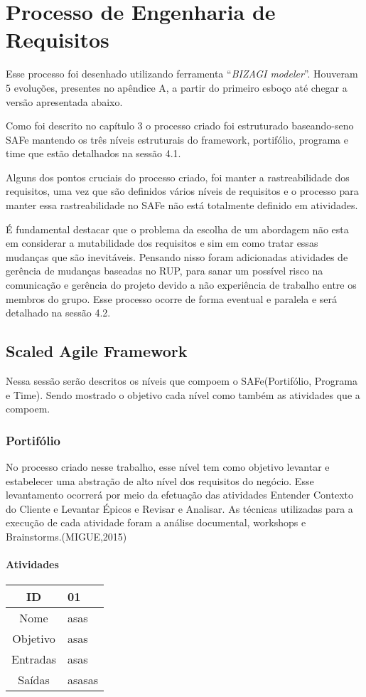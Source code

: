 \chapter[Processo de Engenharia de Requisitos]{Processo de Engenharia de Requisitos}\label{cap4}

Esse processo foi desenhado utilizando ferramenta ``\textit{BIZAGI modeler}''. Houveram 5 evoluções,
presentes no apêndice A, a partir do primeiro esboço até chegar a versão apresentada abaixo.


Como foi descrito no capítulo 3 o processo criado foi estruturado baseando-seno
SAFe mantendo os três níveis estruturais do framework, portifólio, programa e time
que estão detalhados na sessão 4.1.

Alguns dos pontos cruciais do processo criado, foi manter a rastreabilidade dos requisitos,
uma vez que são definidos vários níveis de requisitos e o processo para manter essa
rastreabilidade  no SAFe não está totalmente definido em atividades.

É fundamental destacar que o problema da escolha de um abordagem não esta em considerar
a mutabilidade dos requisitos e sim em como tratar essas mudanças que são inevitáveis.
Pensando nisso foram adicionadas atividades de gerência de mudanças baseadas no RUP,
para sanar um possível risco na comunicação e gerência do projeto devido a não experiência
de trabalho entre os membros do grupo. Esse processo ocorre de forma eventual e paralela
e será detalhado na sessão 4.2.

\section{Scaled Agile Framework}

Nessa sessão serão descritos os níveis que compoem o SAFe(Portifólio, Programa e Time).
Sendo mostrado o objetivo cada nível como também as atividades que a compoem.

\subsection{Portifólio}

No processo criado nesse trabalho, esse nível tem como objetivo levantar e estabelecer
uma abstração de alto nível dos requisitos do negócio. Esse levantamento ocorrerá
por meio da efetuação das atividades Entender Contexto do Cliente e Levantar Épicos
e Revisar e Analisar. As técnicas utilizadas para a execução de cada atividade foram
a análise documental, workshops e Brainstorms.(MIGUE,2015)

\subsubsection{Atividades}

\begin{table}[H]
    \begin{tabular}{|c|l|}
    \hline
    ID       & 01   \\ \hline
    Nome     & asas   \\ \hline
    Objetivo & asas   \\ \hline
    Entradas & asas   \\ \hline
    Saídas   & asasas \\ \hline
    \end{tabular}
\end{table}
